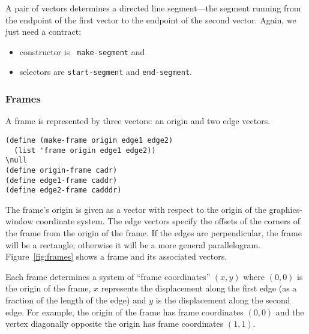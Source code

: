 A pair of vectors determines a directed line segment---the segment
running from the endpoint of the first vector to the endpoint of the
second vector.  Again, we just need a contract:  

\begin{itemize}

\item constructor is {\tt
make-segment} and

\item  selectors are {\tt start-segment} and {\tt end-segment}.

\end{itemize}

\subsubsection{Frames}

A frame is represented by three vectors: an origin and two edge
vectors.

\begin{verbatim}
(define (make-frame origin edge1 edge2)
  (list 'frame origin edge1 edge2))
\null
(define origin-frame cadr)
(define edge1-frame caddr)
(define edge2-frame cadddr)
\end{verbatim}

The frame's origin is given as a vector with respect to the origin of
the graphics-window coordinate system.  The edge vectors specify the
offsets of the corners of the frame from the origin of the frame.  If
the edges are perpendicular, the frame will be a rectangle; otherwise
it will be a more general parallelogram.  Figure~\ref{fig:frames} shows a
frame and its associated vectors.

%

Each frame determines a system of ``frame coordinates'' $(x,y)$ where
$(0,0)$ is the origin of the frame, $x$ represents the displacement 
along the first edge (as a fraction of the length of the edge) and $y$ is the
displacement along the second edge.  For example, the origin of the
frame has frame coordinates $(0,0)$ and the vertex diagonally opposite
the origin has frame coordinates $(1,1)$.


